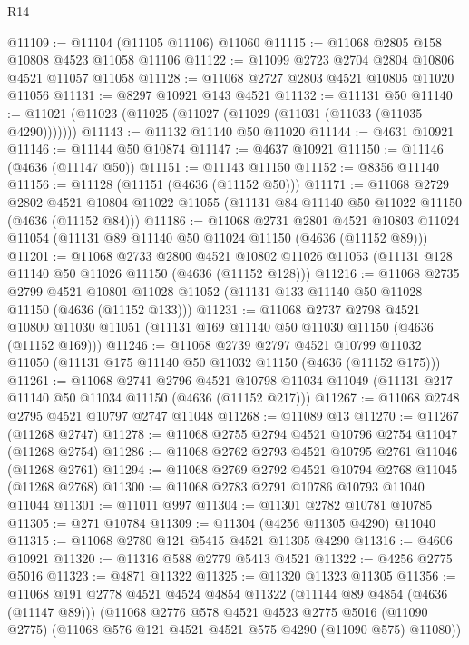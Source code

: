 \begin{lexlean}{R14}
\begin{coremodule}
@11109 := @11104 (@11105 @11106) @11060
@11115 := @11068 @2805 @158 @10808 @4523 @11058 @11106
@11122 := @11099 @2723 @2704 @2804 @10806 @4521 @11057 @11058
@11128 := @11068 @2727 @2803 @4521 @10805 @11020 @11056
@11131 := @8297 @10921 @143 @4521
@11132 := @11131 @50
@11140 := @11021 (@11023 (@11025 (@11027 (@11029 (@11031 (@11033 (@11035 @4290)))))))
@11143 := @11132 @11140 @50 @11020
@11144 := @4631 @10921
@11146 := @11144 @50 @10874
@11147 := @4637 @10921
@11150 := @11146 (@4636 (@11147 @50))
@11151 := @11143 @11150
@11152 := @8356 @11140
@11156 := @11128 (@11151 (@4636 (@11152 @50)))
@11171 := @11068
    @2729
    @2802
    @4521
    @10804
    @11022
    @11055
    (@11131 @84 @11140 @50 @11022 @11150 (@4636 (@11152 @84)))
@11186 := @11068
    @2731
    @2801
    @4521
    @10803
    @11024
    @11054
    (@11131 @89 @11140 @50 @11024 @11150 (@4636 (@11152 @89)))
@11201 := @11068
    @2733
    @2800
    @4521
    @10802
    @11026
    @11053
    (@11131 @128 @11140 @50 @11026 @11150 (@4636 (@11152 @128)))
@11216 := @11068
    @2735
    @2799
    @4521
    @10801
    @11028
    @11052
    (@11131 @133 @11140 @50 @11028 @11150 (@4636 (@11152 @133)))
@11231 := @11068
    @2737
    @2798
    @4521
    @10800
    @11030
    @11051
    (@11131 @169 @11140 @50 @11030 @11150 (@4636 (@11152 @169)))
@11246 := @11068
    @2739
    @2797
    @4521
    @10799
    @11032
    @11050
    (@11131 @175 @11140 @50 @11032 @11150 (@4636 (@11152 @175)))
@11261 := @11068
    @2741
    @2796
    @4521
    @10798
    @11034
    @11049
    (@11131 @217 @11140 @50 @11034 @11150 (@4636 (@11152 @217)))
@11267 := @11068 @2748 @2795 @4521 @10797 @2747 @11048
@11268 := @11089 @13
@11270 := @11267 (@11268 @2747)
@11278 := @11068 @2755 @2794 @4521 @10796 @2754 @11047 (@11268 @2754)
@11286 := @11068 @2762 @2793 @4521 @10795 @2761 @11046 (@11268 @2761)
@11294 := @11068 @2769 @2792 @4521 @10794 @2768 @11045 (@11268 @2768)
@11300 := @11068 @2783 @2791 @10786 @10793 @11040 @11044
@11301 := @11011 @997
@11304 := @11301 @2782 @10781 @10785
@11305 := @271 @10784
@11309 := @11304 (@4256 @11305 @4290) @11040
@11315 := @11068 @2780 @121 @5415 @4521 @11305 @4290
@11316 := @4606 @10921
@11320 := @11316 @588 @2779 @5413 @4521
@11322 := @4256 @2775 @5016
@11323 := @4871 @11322
@11325 := @11320 @11323 @11305
@11356 := @11068
    @191
    @2778
    @4521
    @4524
    @4854
    @11322
    (@11144 @89 @4854 (@4636 (@11147 @89)))
    (@11068
      @2776
      @578
      @4521
      @4523
      @2775
      @5016
      (@11090 @2775)
      (@11068 @576 @121 @4521 @4521 @575 @4290 (@11090 @575) @11080))

\end{coremodule}
\end{lexlean}
